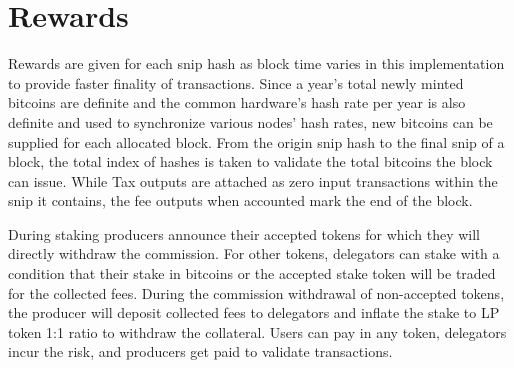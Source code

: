 \documentclass[a4paper,10pt]{article}
\begin{document}
\section{Rewards}
Rewards are given for each snip hash as block time varies in this implementation to provide faster finality of transactions. Since a year's total newly minted bitcoins are definite and the common hardware's hash rate per year is also definite and used to synchronize various nodes' hash rates, new bitcoins can be supplied for each allocated block. From the origin snip hash to the final snip of a block, the total index of hashes is taken to validate the total bitcoins the block can issue. While Tax outputs are attached as zero input transactions within the snip it contains, the fee outputs when accounted mark the end of the block. 

During staking producers announce their accepted tokens for which they will directly withdraw the commission. For other tokens, delegators can stake with a condition that their stake in bitcoins or the accepted stake token will be traded for the collected fees. During the commission withdrawal of non-accepted tokens, the producer will deposit collected fees to delegators and inflate the stake to LP token 1:1 ratio to withdraw the collateral. Users can pay in any token, delegators incur the risk, and producers get paid to validate transactions.
\end{document}
